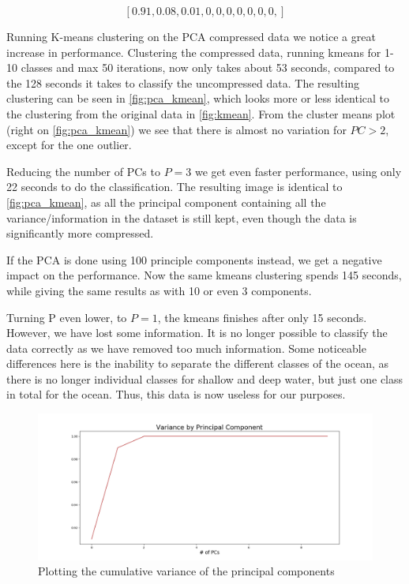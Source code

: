 \begin{equation}
    \label{eq:pca_var}
    [0.91, 0.08, 0.01, 0,   0,   0,   0,   0,   0,   0,  ]
\end{equation}

Running K-means clustering on the PCA compressed data we notice a great increase in performance. 
Clustering the compressed data, running kmeans for 1-10 classes and max 50 iterations, 
now only takes about 53 seconds, compared to the 128 seconds 
it takes to classify the uncompressed data. The resulting clustering can be seen in 
\cref{fig:pca_kmean}, which looks more or less identical to the clustering from the 
original data in \cref{fig:kmean}. From the cluster means plot (right on \cref{fig:pca_kmean}) 
we see that there is almost no variation for $PC > 2$, except for the one outlier.

Reducing the number of PCs to $P = 3$ we get even faster performance, using only 
22 seconds to do the classification. The resulting image is identical to \cref{fig:pca_kmean}, 
as all the principal component containing all the variance/information in the dataset is still kept, 
even though the data is significantly more compressed. 

If the PCA is done using 100 principle components instead, we get a negative impact on the 
performance. Now the same kmeans clustering spends 145 seconds, while giving the same 
results as with 10 or even 3 components.

Turning P even lower, to $P = 1$, the kmeans finishes after only 15 seconds. However, we 
have lost some information. It is no longer possible to classify the data correctly as we 
have removed too much information. Some noticeable differences here is the inability to 
separate the different classes of the ocean, as there is no longer individual classes for 
shallow and deep water, but just one class in total for the ocean. Thus, this data is now 
useless for our purposes. 

\begin{figure}
    \centering
    \includegraphics[width=\textwidth]{../fig/pca/variance_cumsum.png}
    \caption{Plotting the cumulative variance of the principal components}
    \label{fig:pca_var}
\end{figure}

